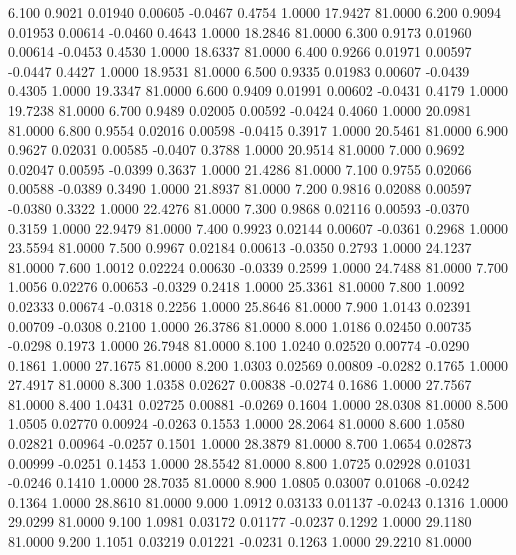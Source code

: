    6.100   0.9021   0.01940   0.00605  -0.0467   0.4754   1.0000  17.9427  81.0000
   6.200   0.9094   0.01953   0.00614  -0.0460   0.4643   1.0000  18.2846  81.0000
   6.300   0.9173   0.01960   0.00614  -0.0453   0.4530   1.0000  18.6337  81.0000
   6.400   0.9266   0.01971   0.00597  -0.0447   0.4427   1.0000  18.9531  81.0000
   6.500   0.9335   0.01983   0.00607  -0.0439   0.4305   1.0000  19.3347  81.0000
   6.600   0.9409   0.01991   0.00602  -0.0431   0.4179   1.0000  19.7238  81.0000
   6.700   0.9489   0.02005   0.00592  -0.0424   0.4060   1.0000  20.0981  81.0000
   6.800   0.9554   0.02016   0.00598  -0.0415   0.3917   1.0000  20.5461  81.0000
   6.900   0.9627   0.02031   0.00585  -0.0407   0.3788   1.0000  20.9514  81.0000
   7.000   0.9692   0.02047   0.00595  -0.0399   0.3637   1.0000  21.4286  81.0000
   7.100   0.9755   0.02066   0.00588  -0.0389   0.3490   1.0000  21.8937  81.0000
   7.200   0.9816   0.02088   0.00597  -0.0380   0.3322   1.0000  22.4276  81.0000
   7.300   0.9868   0.02116   0.00593  -0.0370   0.3159   1.0000  22.9479  81.0000
   7.400   0.9923   0.02144   0.00607  -0.0361   0.2968   1.0000  23.5594  81.0000
   7.500   0.9967   0.02184   0.00613  -0.0350   0.2793   1.0000  24.1237  81.0000
   7.600   1.0012   0.02224   0.00630  -0.0339   0.2599   1.0000  24.7488  81.0000
   7.700   1.0056   0.02276   0.00653  -0.0329   0.2418   1.0000  25.3361  81.0000
   7.800   1.0092   0.02333   0.00674  -0.0318   0.2256   1.0000  25.8646  81.0000
   7.900   1.0143   0.02391   0.00709  -0.0308   0.2100   1.0000  26.3786  81.0000
   8.000   1.0186   0.02450   0.00735  -0.0298   0.1973   1.0000  26.7948  81.0000
   8.100   1.0240   0.02520   0.00774  -0.0290   0.1861   1.0000  27.1675  81.0000
   8.200   1.0303   0.02569   0.00809  -0.0282   0.1765   1.0000  27.4917  81.0000
   8.300   1.0358   0.02627   0.00838  -0.0274   0.1686   1.0000  27.7567  81.0000
   8.400   1.0431   0.02725   0.00881  -0.0269   0.1604   1.0000  28.0308  81.0000
   8.500   1.0505   0.02770   0.00924  -0.0263   0.1553   1.0000  28.2064  81.0000
   8.600   1.0580   0.02821   0.00964  -0.0257   0.1501   1.0000  28.3879  81.0000
   8.700   1.0654   0.02873   0.00999  -0.0251   0.1453   1.0000  28.5542  81.0000
   8.800   1.0725   0.02928   0.01031  -0.0246   0.1410   1.0000  28.7035  81.0000
   8.900   1.0805   0.03007   0.01068  -0.0242   0.1364   1.0000  28.8610  81.0000
   9.000   1.0912   0.03133   0.01137  -0.0243   0.1316   1.0000  29.0299  81.0000
   9.100   1.0981   0.03172   0.01177  -0.0237   0.1292   1.0000  29.1180  81.0000
   9.200   1.1051   0.03219   0.01221  -0.0231   0.1263   1.0000  29.2210  81.0000
